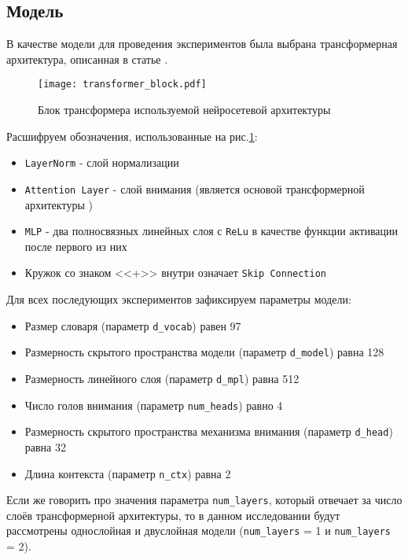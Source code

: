 \documentclass{article}
\begin{document}
\subsection{Модель}
В качестве модели для проведения экспериментов была выбрана трансформерная архитектура, описанная в статье \cite{omnigrok}.
\begin{figure}[h]
\centering
\texttt{[image: transformer\_block.pdf]}
\caption{Блок трансформера используемой нейросетевой архитектуры}
\label{fig:fig5}
\end{figure}
\par Расшифруем обозначения, использованные на рис.\ref{fig:fig5}:
\begin{itemize}
    \item \verb|LayerNorm| - слой нормализации \cite{layer_norm}
    \item \verb|Attention Layer| - слой внимания (является основой трансформерной архитектуры \cite{attn_is_all})
    \item \verb|MLP| - два полносвязных линейных слоя с \verb|ReLu|  в качестве функции активации после первого из них
    \item Кружок со знаком <<+>> внутри означает \verb|Skip Connection|
\end{itemize}
Для всех последующих экспериментов зафиксируем параметры модели:
\begin{itemize}
    \item Размер словаря (параметр \verb|d_vocab|) равен 97
    \item Размерность скрытого пространства модели (параметр \verb|d_model|) равна 128
    \item Размерность линейного слоя (параметр \verb|d_mpl|) равна 512
    \item Число голов внимания (параметр \verb|num_heads|) равно 4
    \item Размерность скрытого пространства механизма внимания (параметр \verb|d_head|) равна 32
    \item Длина контекста (параметр \verb|n_ctx|) равна 2
\end{itemize}
Если же говорить про значения параметра \verb|num_layers|, который отвечает за число слоёв трансформерной архитектуры, то в данном исследовании будут рассмотрены однослойная и двуслойная модели (\verb|num_layers| = 1 и \verb|num_layers| = 2).
\end{document}
